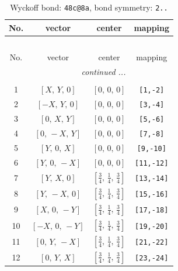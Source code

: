 \documentclass[fleqn,8pt]{jsarticle}
\begin{document}
\begin{longtable}{cccc}
\caption{Wyckoff bond: {\tt 48c@8a}, bond symmetry: {\tt 2..}}
 \\
 \hline \hline
No. & vector & center & mapping \\ \hline \endfirsthead

\multicolumn{3}{l}{\tablename\ \thetable{}} \\
 \hline \hline
No. & vector & center & mapping \\ \hline \endhead

 \hline \hline
\multicolumn{3}{r}{\footnotesize\it continued ...} \\ \endfoot

 \hline \hline
\multicolumn{3}{r}{} \\ \endlastfoot

1 & $\left[ X,\, Y,\, 0 \right]$ & $\left[ 0,\, 0,\, 0 \right]$ & {\tt [1,-2]} \\ \hline
2 & $\left[ - X,\, Y,\, 0 \right]$ & $\left[ 0,\, 0,\, 0 \right]$ & {\tt [3,-4]} \\ \hline
3 & $\left[ 0,\, X,\, Y \right]$ & $\left[ 0,\, 0,\, 0 \right]$ & {\tt [5,-6]} \\ \hline
4 & $\left[ 0,\, - X,\, Y \right]$ & $\left[ 0,\, 0,\, 0 \right]$ & {\tt [7,-8]} \\ \hline
5 & $\left[ Y,\, 0,\, X \right]$ & $\left[ 0,\, 0,\, 0 \right]$ & {\tt [9,-10]} \\ \hline
6 & $\left[ Y,\, 0,\, - X \right]$ & $\left[ 0,\, 0,\, 0 \right]$ & {\tt [11,-12]} \\ \hline
7 & $\left[ Y,\, X,\, 0 \right]$ & $\left[ \frac{3}{4},\, \frac{1}{4},\, \frac{3}{4} \right]$ & {\tt [13,-14]} \\ \hline
8 & $\left[ Y,\, - X,\, 0 \right]$ & $\left[ \frac{3}{4},\, \frac{1}{4},\, \frac{3}{4} \right]$ & {\tt [15,-16]} \\ \hline
9 & $\left[ X,\, 0,\, - Y \right]$ & $\left[ \frac{3}{4},\, \frac{1}{4},\, \frac{3}{4} \right]$ & {\tt [17,-18]} \\ \hline
10 & $\left[ - X,\, 0,\, - Y \right]$ & $\left[ \frac{3}{4},\, \frac{1}{4},\, \frac{3}{4} \right]$ & {\tt [19,-20]} \\ \hline
11 & $\left[ 0,\, Y,\, - X \right]$ & $\left[ \frac{3}{4},\, \frac{1}{4},\, \frac{3}{4} \right]$ & {\tt [21,-22]} \\ \hline
12 & $\left[ 0,\, Y,\, X \right]$ & $\left[ \frac{3}{4},\, \frac{1}{4},\, \frac{3}{4} \right]$ & {\tt [23,-24]} \\
\end{longtable}
\end{document}
